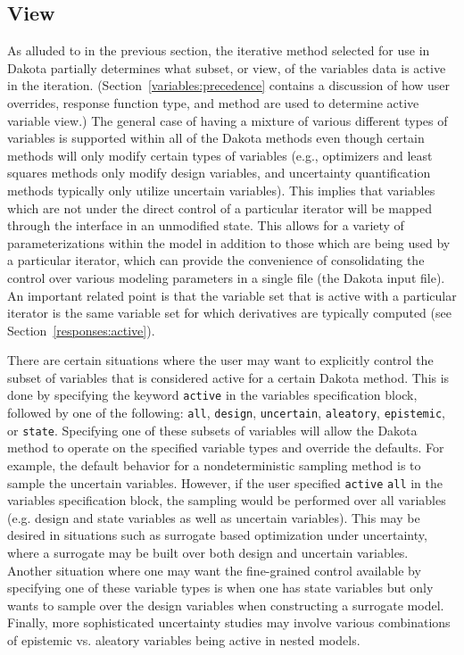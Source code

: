 \subsection{View}\label{variables:mixedview}
As alluded to in the previous section, the iterative method selected
for use in Dakota partially determines what subset, or view, 
of the variables data is active in the iteration. 
(Section~\ref{variables:precedence} contains a discussion of
how user overrides, response function type, and method are used to determine 
active variable view.) The general case of having 
a mixture of various different types of variables is supported 
within all of the Dakota methods even though certain methods will 
only modify certain types of variables (e.g., optimizers and least squares 
methods only modify design variables, and uncertainty quantification methods 
typically only utilize uncertain variables).  This implies that variables 
which are not under the direct control of a particular iterator will be 
mapped through the interface in an unmodified state. This allows for a 
variety of parameterizations within the model in addition to those which are
being used by a particular iterator, which can provide the convenience
of consolidating the control over various modeling parameters in a
single file (the Dakota input file). An important related point is
that the variable set that is active with a particular iterator is the
same variable set for which derivatives are typically computed (see
Section~\ref{responses:active}).

There are certain situations where the user may want to explicitly 
control the subset of variables that is considered active for a 
certain Dakota method.  This is done by specifying the keyword 
\texttt{active} in the variables specification block, followed by 
one of the following:  \texttt{all}, \texttt{design}, \texttt{uncertain},
\texttt{aleatory}, \texttt{epistemic}, or \texttt{state}.  
Specifying one of these subsets of variables will allow the 
Dakota method to operate on the specified variable types and override 
the defaults.  For example, the default behavior for a 
nondeterministic sampling method is to sample the uncertain 
variables.  However, if the user specified \texttt{active}  \texttt{all} 
in the variables specification block, the sampling would be performed 
over all variables (e.g. design and state variables as well as 
uncertain variables).  This may be desired in situations such as 
surrogate based optimization under uncertainty, where a surrogate may 
be built over both design and uncertain variables.  
Another situation where one may want the fine-grained control 
available by specifying one of these variable types is when one 
has state variables but only wants to sample over the design 
variables when constructing a surrogate model.  Finally, 
more sophisticated uncertainty studies may involve various 
combinations of epistemic vs. aleatory variables being active 
in nested models.

